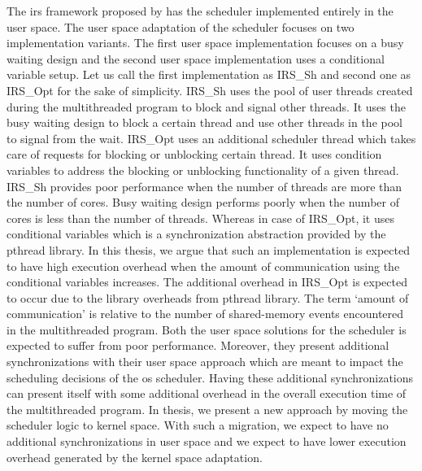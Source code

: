 The \acrshort{irs} framework proposed by \citet{metzler2017quick} has the scheduler implemented entirely in the user space. 
The user space adaptation of the scheduler focuses on two implementation variants. 
The first user space implementation focuses on a busy waiting design and the second user space implementation uses a conditional variable setup. 
Let us call the first implementation as IRS\_Sh and second one as IRS\_Opt for the sake of simplicity. 
IRS\_Sh uses the pool of user threads created during the multithreaded program to block and signal other threads. 
It uses the busy waiting design to block a certain thread and use other threads in the pool to signal from the wait. 
IRS\_Opt uses an additional scheduler thread which takes care of requests for blocking or unblocking certain thread. 
It uses condition variables to address the blocking or unblocking functionality of a given thread. 
IRS\_Sh provides poor performance when the number of threads are more than the number of cores. 
Busy waiting design performs poorly when the number of cores is less than the number of threads. 
Whereas in case of IRS\_Opt, it uses conditional variables which is a synchronization abstraction provided by the pthread library. 
In this thesis, we argue that such an implementation is expected to have high execution overhead when the amount of communication using the conditional variables increases. 
The additional overhead in IRS\_Opt is expected to occur due to the library overheads from pthread library. 
The term `amount of communication' is relative to the number of shared-memory events encountered in the multithreaded program. 
Both the user space solutions for the scheduler is expected to suffer from poor performance. 
Moreover, they present additional synchronizations with their user space approach which are meant to impact the scheduling decisions of the \acrshort{os} scheduler. 
Having these additional synchronizations can present itself with some additional overhead in the overall execution time of the multithreaded program. 
In thesis, we present a new approach by moving the scheduler logic to kernel space. 
With such a migration, we expect to have no additional synchronizations in user space and we expect to have lower execution overhead generated by the kernel space adaptation.  

